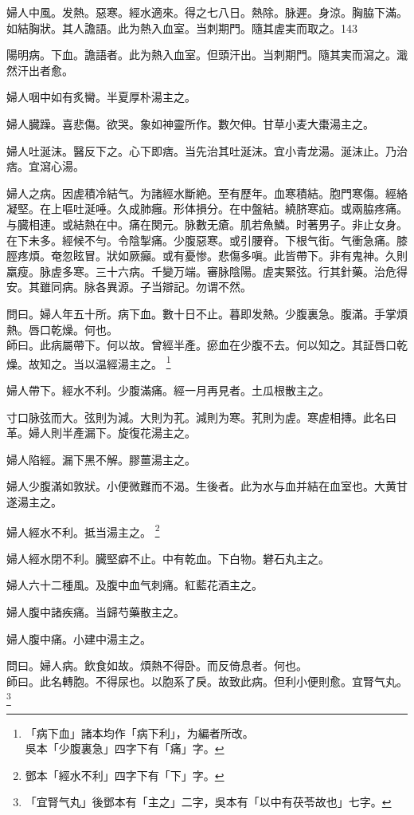 \documentclass[b5paper,twoside,zihao=-4,UTF8]{ctexbook}
\begin{document}
婦人中風。发熱。惡寒。經水適來。得之七八日。熱除。脉遲。身涼。胸脇下滿。如結胸狀。其人譫語。此为熱入血室。当刺期門。隨其{虗}実而取之。143

陽明病。下血。譫語者。此为熱入血室。但頭汗出。当刺期門。隨其実而瀉之。濈然汗出者愈。

婦人咽中如有炙臠。半夏厚朴湯主之。

婦人臓躁。喜悲傷。欲哭。象如神靈所作。數欠伸。甘{草小}麦大棗湯主之。

婦人吐涎沫。醫反下之。心下即痞。当先治其吐涎沫。宜小青龙湯。涎沫止。乃治痞。宜瀉心湯。

婦人之病。因虗積冷結气。为諸經水斷絶。至有歷年。血寒積結。胞門寒傷。經絡凝堅。在上嘔吐涎唾。久成肺癰。形体損分。在中盤結。繞脐寒疝。或兩脇疼痛。与臓相連。或結熱{在}中。痛在関元。脉數无瘡。肌若魚鱗。时著男子。非止女身。在下未多。經候不勻。令陰掣痛。少腹惡寒。或引腰脊。下根气街。气衝急痛。膝脛疼煩。奄忽眩冒。狀如厥癲。或有憂惨。悲傷多嗔。此皆帶下。非有鬼神。久則羸瘦。脉虗多寒。三十六病。千變万端。審脉陰陽。虗実緊弦。行其針藥。治危得安。其雖同病。脉各異源。子当辯記。勿谓不然。

問曰。婦人年五十所。病下血。數十日不止。暮即发熱。少腹裏急。腹滿。手掌煩熱。唇口乾燥。何也。\\
師曰。此病屬帶下。何以故。曾經半產。瘀血在少腹不去。何以知之。其証唇口乾燥。故知之。当以温經湯主之。
	\footnote{「病下血」諸本均作「病下利」，为編者所改。\\吳本「少腹裏急」四字下有「痛」字。}

{婦人}帶下。經水不利。少腹滿痛。經一月再見者。土瓜根散主之。

寸口脉弦而大。弦則为減。大則为芤。減則为寒。芤則为虗。寒虗相摶。此名曰革。婦人則半產漏下。旋復花湯主之。

婦人陷經。漏下黑不解。膠薑湯主之。

婦人少腹滿如敦狀。小便微難而不渴。生後者。此为水与血并結在血室也。大黄甘遂湯主之。

婦人經水不利。抵当湯主之。
	\footnote{鄧本「經水不利」四字下有「下」字。}

婦人經水閉不利。臓堅癖不止。中有乾血。下白物。礬石丸主之。

婦人六十二種風。及腹中血气刺痛。紅藍花酒主之。

婦人腹中諸疾痛。当歸芍藥散主之。

婦人腹中痛。小建中湯主之。

問曰。婦人病。飲食如故。煩熱不得卧。而反倚息者。何也。\\
師曰。此名轉胞。不得尿也。以胞系了戾。故致此病。但利小便則愈。宜腎气丸。
	\footnote{「宜腎气丸」後鄧本有「主之」二字，吳本有「以中有茯苓故也」七字。}
\end{document}
